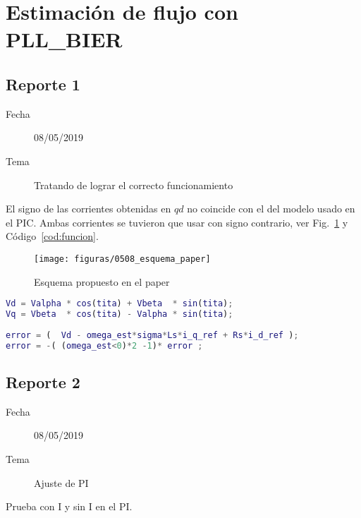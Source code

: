 \documentclass{article}
\begin{document}
	\section{Estimación de flujo con PLL\_BIER}
	
		
		\subsection{Reporte 1}
		\begin{description}
			\item[Fecha]  08/05/2019 
			\item[Tema] Tratando de lograr el correcto funcionamiento
		\end{description}
	
	
		El signo de las corrientes obtenidas en $qd$ no coincide con el del modelo usado en el PIC. Ambas corrientes se tuvieron que usar con signo contrario, ver Fig.~\ref{fig:esquemapaper} y Código~\ref{cod:funcion}.
		
		\begin{figure}
			\centering
			\texttt{[image: figuras/0508\_esquema\_paper]}
			\caption{Esquema propuesto en el paper}
			\label{fig:esquemapaper}
		\end{figure}
		
		\begin{lstlisting}[language=MATLAB,caption={Contenido de función de MATLAB},label=cod:funcion,]
Vd = Valpha * cos(tita) + Vbeta  * sin(tita);
Vq = Vbeta  * cos(tita) - Valpha * sin(tita);
          
error = (  Vd - omega_est*sigma*Ls*i_q_ref + Rs*i_d_ref );
error = -( (omega_est<0)*2 -1)* error ;		
		\end{lstlisting}
  		
  		
  		\subsection{Reporte 2}
  		\begin{description}
  			\item[Fecha]  08/05/2019 
  			\item[Tema] Ajuste de PI
  		\end{description}
		
		Prueba con I y sin I en el PI.
		
	
	
	
	
	
	
	
\end{document}
